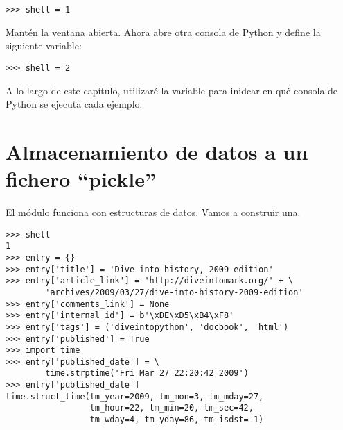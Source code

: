 \noindent\begin{minipage}{\textwidth}
\begin{lstlisting}[mathescape=True]
>>> shell = 1
\end{lstlisting}
\end{minipage}

Mantén la ventana abierta. Ahora abre otra consola de Python y define la siguiente variable:

\noindent\begin{minipage}{\textwidth}
\begin{lstlisting}[mathescape=True]
>>> shell = 2
\end{lstlisting}
\end{minipage}

A lo largo de este capítulo, utilizaré la variable  para inidcar en qué consola de Python se ejecuta cada ejemplo.

\section{Almacenamiento de datos a un fichero ``pickle''}

El módulo  funciona con estructuras de datos. Vamos a construir una.

\noindent\begin{minipage}{\textwidth}
\begin{lstlisting}[mathescape=True]
>>> shell
1
>>> entry = {}
>>> entry['title'] = 'Dive into history, 2009 edition'
>>> entry['article_link'] = 'http://diveintomark.org/' + \
        'archives/2009/03/27/dive-into-history-2009-edition'
>>> entry['comments_link'] = None
>>> entry['internal_id'] = b'\xDE\xD5\xB4\xF8'
>>> entry['tags'] = ('diveintopython', 'docbook', 'html')
>>> entry['published'] = True
>>> import time
>>> entry['published_date'] = \
        time.strptime('Fri Mar 27 22:20:42 2009')
>>> entry['published_date']
time.struct_time(tm_year=2009, tm_mon=3, tm_mday=27, 
                 tm_hour=22, tm_min=20, tm_sec=42, 
                 tm_wday=4, tm_yday=86, tm_isdst=-1)
\end{lstlisting}
\end{minipage}

